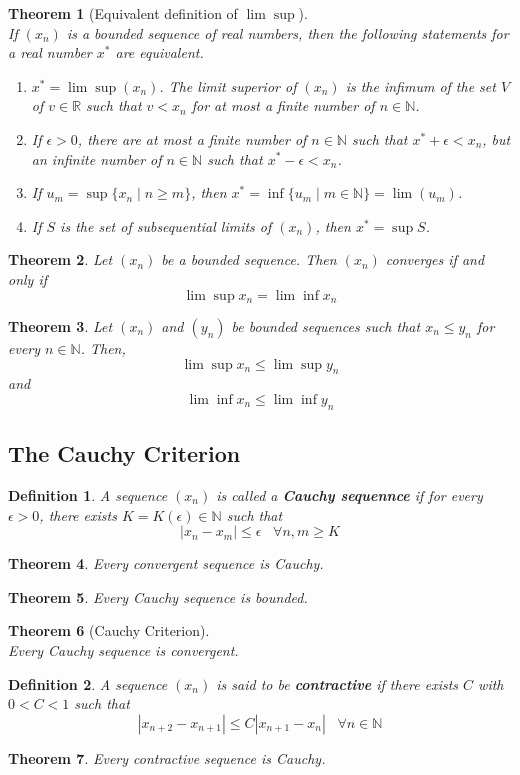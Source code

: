 \documentclass[8pt]{article}
\newtheorem{definition}{Definition}[section]
\newtheorem{theorem}{Theorem}[section]
\theoremstyle{definition}
\begin{document}
\begin{theorem}[Equivalent definition of $\lim\sup$]
\hfill\\\normalfont 
If $(x_n)$ is a bounded sequence of real numbers, then the following statements for a real number $x^\ast$ are equivalent.
\begin{enumerate}
\item $x^\ast = \lim\sup (x_n)$. The limit superior of $(x_n)$ is the infimum of the set $V$ of $v\in\mathbb{R}$ such that $v<x_n$ for at most a finite number of $n\in\mathbb{N}$.
\item If $\epsilon>0$, there are at most a finite number of $n\in\mathbb{N}$ such that $x^\ast+\epsilon<x_n$, but an infinite number of $n\in\mathbb{N}$ such that $x^\ast-\epsilon<x_n$.
\item If $u_m=\sup\{x_n\mid n\geq m\}$, then $x^\ast = \inf \{u_m\mid m\in\mathbb{N}\} = \lim(u_m)$.
\item If $S$ is the set of subsequential limits of $(x_n)$, then $x^\ast = \sup S$.
\end{enumerate}
\end{theorem}
\begin{theorem} \normalfont Let $(x_n)$ be a bounded sequence. Then $(x_n)$ converges if and only if
\[
\lim\sup x_n=\lim\inf x_n
\]
\end{theorem}
\begin{theorem}\normalfont Let $(x_n)$ and $(y_n)$ be bounded sequences such that $x_n\leq y_n$ for every $n\in\mathbb{N}$. Then,
\[
\lim\sup x_n\leq \lim\sup y_n
\]
and
\[
\lim\inf x_n\leq \lim\inf y_n
\]
\end{theorem}
\subsection{The Cauchy Criterion}
\begin{definition}\normalfont A sequence $(x_n)$ is called a \textbf{Cauchy sequennce} if for every $\epsilon>0$, there exists $K=K(\epsilon)\in\mathbb{N}$ such that
\[
|x_n-x_m|\leq \epsilon \;\;\;\forall n,m\geq K
\]
\end{definition}
\begin{theorem}\normalfont Every convergent sequence is Cauchy.
\end{theorem}
\begin{theorem}\normalfont Every Cauchy sequence is bounded.
\end{theorem}
\begin{theorem}[Cauchy Criterion]
\hfill\\\normalfont Every Cauchy sequence is convergent.
\end{theorem}
\begin{definition}\normalfont A sequence $(x_n)$ is said to be \textbf{contractive} if there exists $C$ with $0<C<1$ such that
\[
|x_{n+2}-x_{n+1}|\leq C|x_{n+1}-x_n|\;\;\;\forall n\in\mathbb{N}
\]
\end{definition}
\begin{theorem}\normalfont Every contractive sequence is Cauchy.
\end{theorem}
\end{document}
